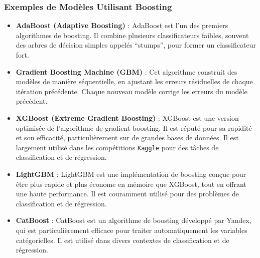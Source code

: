 \subsubsection*{Exemples de Modèles Utilisant Boosting }
\begin{itemize}
	\item \textbf{AdaBoost (Adaptive Boosting)} : 
	AdaBoost est l'un des premiers algorithmes de boosting. Il combine plusieurs classificateurs faibles, souvent des arbres de décision simples appelés ``stumps'', pour former un classificateur fort.
	\item \textbf{Gradient Boosting Machine (GBM)} : 
	Cet algorithme construit des modèles de manière séquentielle, en ajustant les erreurs résiduelles de chaque itération précédente. Chaque nouveau modèle corrige les erreurs du modèle précédent.
	
	\item \textbf{XGBoost (Extreme Gradient Boosting)} : 
	XGBoost est une version optimisée de l'algorithme de gradient boosting. Il est réputé pour sa rapidité et son efficacité, particulièrement sur de grandes bases de données. Il est largement utilisé dans les compétitions \texttt{Kaggle} pour des tâches de classification et de régression.
	
	\item \textbf{LightGBM} : 
	LightGBM est une implémentation de boosting conçue pour être plus rapide et plus économe en mémoire que XGBoost, tout en offrant une haute performance. Il est couramment utilisé pour des problèmes de classification et de régression.
	
	\item \textbf{CatBoost} : 
	CatBoost est un algorithme de boosting développé par Yandex, qui est particulièrement efficace pour traiter automatiquement les variables catégorielles. Il est utilisé dans divers contextes de classification et de régression.
\end{itemize}
\newpage
